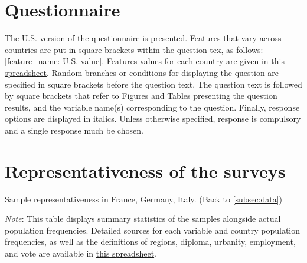 

\renewcommand{\theenumi}{\arabic{enumi}}
\clearpage
\section{Questionnaire}\label{app:questionnaire}
The U.S. version of the questionnaire is presented. Features that vary across countries are put in square brackets within the question tex, as follows: [feature\_name: U.S. value]. Features values for each country are given in \href{https://github.com/bixiou/robustness_global_redistr/raw/main/questionnaire/sources.xlsx}{this spreadsheet}. Random branches or conditions for displaying the question are specified in square brackets before the question text. The question text is followed by square brackets that refer to Figures and Tables presenting the question results, and the variable name(s) corresponding to the question. Finally, response options are displayed in italics. 
Unless otherwise specified, response is compulsory and a single response much be chosen.



\clearpage
\section{Representativeness of the surveys}\label{app:representativeness}

\begin{table}[h!]
    \caption[Sample representativeness in FR, DE, IT]{Sample representativeness in France, Germany, Italy. (Back to \ref{subsec:data}) } \label{tab:representativeness_1}
    \makebox[\textwidth][c]{
        \resizebox*{!}{.60\textheight}{%
        
        }
    }
    {\footnotesize \textit{Note}: This table displays summary statistics of the samples alongside actual population frequencies. 
    Detailed sources for each variable and country population frequencies, as well as the definitions of regions, diploma, urbanity, employment, and vote are available in \href{https://github.com/bixiou/robustness_global_redistr/raw/main/questionnaire/sources.xlsx}{this spreadsheet}. 
    } 
\end{table}

